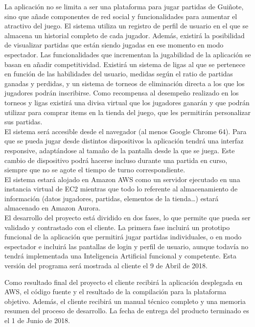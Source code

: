 \documentclass[]{article}
\begin{document}
La aplicación no se limita a ser una plataforma para jugar partidas de Guiñote, sino que añade componentes de red social y funcionalidades para aumentar el atractivo del juego. El sistema utiliza un registro de perfil de usuario en el que se almacena un historial completo de cada jugador. Además, existirá la posibilidad de visualizar partidas que están siendo jugadas en ese momento en modo espectador. Las funcionalidades que incrementan la jugabilidad de la aplicación se basan en añadir competitividad. Existirá un sistema de ligas al que se pertenece en función de las habilidades del usuario, medidas según el ratio de partidas ganadas y perdidas, y un sistema de torneos de eliminación directa a los que los jugadores podrán inscribirse. Como recompensa al desempeño realizado en los torneos y ligas existirá una divisa virtual que los jugadores ganarán y que podrán utilizar para comprar items en la tienda del juego, que les permitirán personalizar sus partidas.\\

El sistema será accesible desde el navegador (al menos Google Chrome 64). Para que se pueda jugar desde distintos dispositivos la aplicación tendrá una interfaz responsive, adaptándose al tamaño de la pantalla desde la que se juega. Este cambio de dispositivo podrá hacerse incluso durante una partida en curso, siempre que no se agote el tiempo de turno correspondiente. \\

El sistema estará alojado en Amazon AWS como un servidor ejecutado en una instancia virtual de EC2 mientras que todo lo referente al almacenamiento de información (datos jugadores, partidas, elementos de la tienda…) estará almacenado en Amazon Aurora. \\

El desarrollo del proyecto está dividido en dos fases, lo que permite que pueda ser validado y contrastado con el cliente. La primera fase incluirá un prototipo funcional de la aplicación que permitirá jugar partidas individuales, o en modo espectador e incluirá las pantallas de login y perfil de usuario, aunque todavía no tendrá implementada una Inteligencia Artificial funcional y competente. Esta versión del programa será mostrada al cliente el 9 de Abril de 2018.

Como resultado final del proyecto el cliente recibirá la aplicación desplegada en AWS, el código fuente y el resultado de la compilación para la plataforma objetivo. Además, el cliente recibirá un manual técnico completo y una memoria resumen del proceso de desarrollo. La fecha de entrega del producto terminado es el 1 de Junio de 2018.\\
\end{document}
